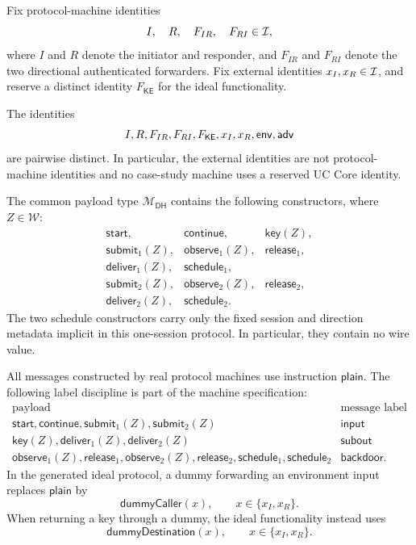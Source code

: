 \begin{definition}
\label{def:dhke-identities}
\notready
Fix protocol-machine identities
\[
  I,\quad R,\quad F_{IR},\quad F_{RI}\in\mathcal{I},
\]
where \(I\) and \(R\) denote the initiator and responder, and \(F_{IR}\) and
\(F_{RI}\) denote the two directional authenticated forwarders.  Fix external
identities \(x_I,x_R\in\mathcal{I}\), and reserve a distinct identity
\(F_{\mathsf{KE}}\) for the ideal functionality.

The identities
\[
  I,R,F_{IR},F_{RI},F_{\mathsf{KE}},x_I,x_R,\mathsf{env},\mathsf{adv}
\]
are pairwise distinct.  In particular, the external identities are not
protocol-machine identities and no case-study machine uses a reserved UC Core
identity.
\end{definition}

\begin{definition}
\label{def:dhke-payload}
\notready
The common payload type \(\mathcal M_{\mathsf{DH}}\) contains the following
constructors, where \(Z\in\mathcal W\):
\[
\begin{array}{lll}
  \mathsf{start},
  &\mathsf{continue},
  &\mathsf{key}(Z),\\[0.2em]
  \mathsf{submit}_1(Z),
  &\mathsf{observe}_1(Z),
  &\mathsf{release}_1,\\
  \mathsf{deliver}_1(Z),
  &\mathsf{schedule}_1,
  &\\[0.2em]
  \mathsf{submit}_2(Z),
  &\mathsf{observe}_2(Z),
  &\mathsf{release}_2,\\
  \mathsf{deliver}_2(Z),
  &\mathsf{schedule}_2.
\end{array}
\]
The two schedule constructors carry only the fixed session and direction
metadata implicit in this one-session protocol.  In particular, they contain
no wire value.

All messages constructed by real protocol machines use instruction
\(\mathsf{plain}\).  The following label discipline is part of the machine
specification:
\[
\begin{array}{c|c}
  \text{payload} & \text{message label}\\ \hline
  \mathsf{start},\mathsf{continue},\mathsf{submit}_1(Z),
    \mathsf{submit}_2(Z) & \mathsf{input}\\
  \mathsf{key}(Z),\mathsf{deliver}_1(Z),
    \mathsf{deliver}_2(Z) & \mathsf{subout}\\
  \mathsf{observe}_1(Z),\mathsf{release}_1,
    \mathsf{observe}_2(Z),\mathsf{release}_2,
    \mathsf{schedule}_1,\mathsf{schedule}_2 & \mathsf{backdoor}.
\end{array}
\]
In the generated ideal protocol, a dummy forwarding an environment input
replaces \(\mathsf{plain}\) by
\[
  \mathsf{dummyCaller}(x),
  \qquad x\in\{x_I,x_R\}.
\]
When returning a key through a dummy, the ideal functionality instead uses
\[
  \mathsf{dummyDestination}(x),
  \qquad x\in\{x_I,x_R\}.
\]
\end{definition}

